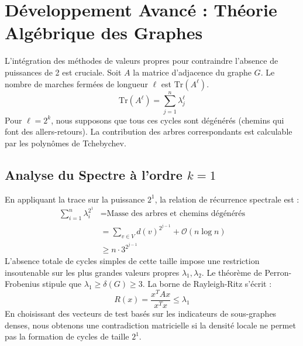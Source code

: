\documentclass[11pt,a4paper]{article}
\theoremstyle{definition}
\begin{document}
\section{Développement Avancé : Théorie Algébrique des Graphes}
L'intégration des méthodes de valeurs propres pour contraindre l'absence de puissances de 2 est cruciale.
Soit $A$ la matrice d'adjacence du graphe $G$. Le nombre de marches fermées de longueur $\ell$ est $\mathrm{Tr}(A^\ell)$.
\begin{equation}
\mathrm{Tr}(A^\ell) = \sum_{j=1}^n \lambda_j^\ell
\end{equation}
Pour $\ell = 2^k$, nous supposons que tous ces cycles sont dégénérés (chemins qui font des allers-retours).
La contribution des arbres correspondants est calculable par les polynômes de Tchebychev.

\subsection{Analyse du Spectre à l'ordre $k=1$}
En appliquant la trace sur la puissance $2^1$, la relation de récurrence spectrale est :
\begin{align*}
\sum_{i=1}^n \lambda_i^{2^1} &= \text{Masse des arbres et chemins dégénérés} \\
&= \sum_{v \in V} d(v)^{2^{j-1}} + \mathcal{O}(n \log n) \\
&\ge n \cdot 3^{2^{j-1}}
\end{align*}
L'absence totale de cycles simples de cette taille impose une restriction insoutenable sur les plus grandes valeurs propres $\lambda_1, \lambda_2$.
Le théorème de Perron-Frobenius stipule que $\lambda_1 \ge \delta(G) \ge 3$.
La borne de Rayleigh-Ritz s'écrit :
\begin{equation}
R(x) = \frac{x^T A x}{x^T x} \le \lambda_1
\end{equation}
En choisissant des vecteurs de test basés sur les indicateurs de sous-graphes denses, nous obtenons une contradiction matricielle si la densité locale ne permet pas la formation de cycles de taille $2^1$.
\end{document}
